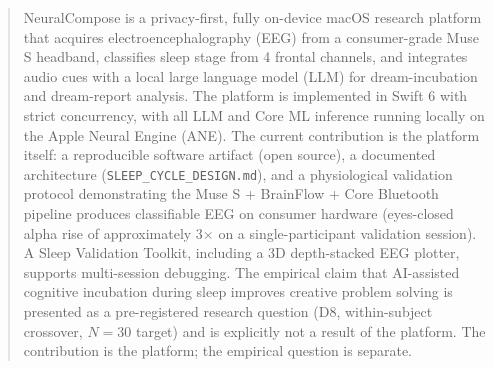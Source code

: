 \begin{abstract}
\noindent
NeuralCompose is a privacy-first, fully on-device macOS research platform that
acquires electroencephalography (EEG) from a consumer-grade Muse S headband,
classifies sleep stage from 4 frontal channels, and integrates audio cues
with a local large language model (LLM) for dream-incubation and dream-report
analysis. The platform is implemented in Swift 6 with strict concurrency, with
all LLM and Core ML inference running locally on the Apple Neural Engine
(ANE). The current contribution is the platform itself: a reproducible
software artifact (open source), a documented architecture
(\texttt{SLEEP\_CYCLE\_DESIGN.md}), and a physiological validation protocol
demonstrating the Muse S + BrainFlow + Core Bluetooth pipeline produces
classifiable EEG on consumer hardware (eyes-closed alpha rise of
approximately 3$\times$ on a single-participant validation session). A
Sleep Validation Toolkit, including a 3D depth-stacked EEG plotter, supports
multi-session debugging. The empirical claim that AI-assisted cognitive
incubation during sleep improves creative problem solving is presented as a
pre-registered research question (D8, within-subject crossover, $N=30$ target)
and is explicitly not a result of the platform. The contribution is the
platform; the empirical question is separate.
\end{abstract}
